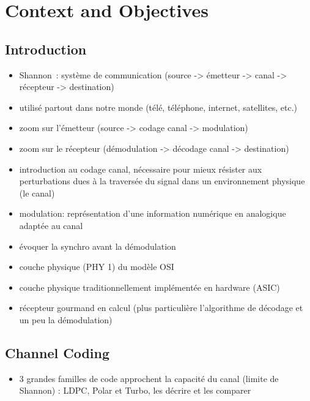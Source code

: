 \graphicspath{{main/chapter1/fig/}}

\chapter{Context and Objectives}

\section{Introduction}

\begin{itemize}
  \item Shannon~\cite{Shannon1948}: système de communication (source -> émetteur
        -> canal -> récepteur -> destination)
  \item utilisé partout dans notre monde (télé, téléphone, internet, satellites,
        etc.)
  \item zoom sur l'émetteur (source -> codage canal -> modulation)
  \item zoom sur le récepteur (démodulation -> décodage canal -> destination)
  \item introduction au codage canal, nécessaire pour mieux résister aux
        perturbations dues à la traversée du signal dans un environnement
        physique (le canal)
  \item modulation: représentation d'une information numérique en analogique
        adaptée au canal
  \item évoquer la synchro avant la démodulation
  \item couche physique (PHY 1) du modèle OSI
  \item couche physique traditionnellement implémentée en hardware (ASIC)
  \item récepteur gourmand en calcul (plus particulière l'algorithme de décodage
        et un peu la démodulation)
\end{itemize}

\section{Channel Coding}

\begin{itemize}
  \item 3 grandes familles de code approchent la capacité du canal (limite de
        Shannon) : LDPC, Polar et Turbo, les décrire et les comparer
\end{itemize}

